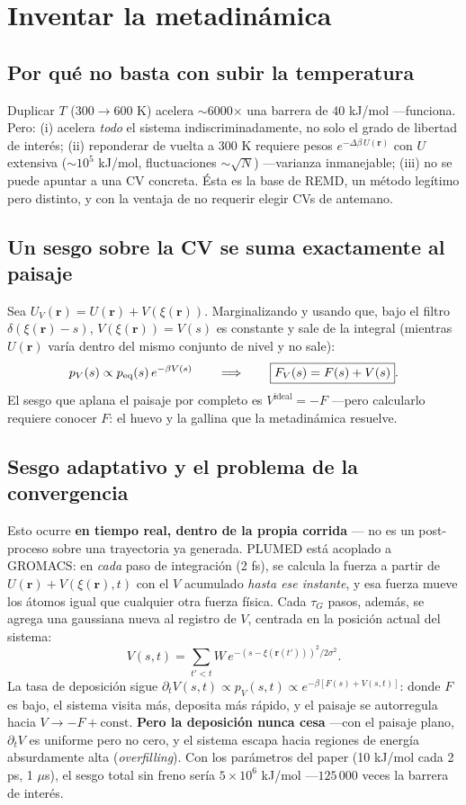 \documentclass[11pt]{article}
\begin{document}
\section{Inventar la metadinámica}

\subsection{Por qué no basta con subir la temperatura}
Duplicar $T$ (300$\to$600 K) acelera $\sim$6000$\times$ una barrera de 40 kJ/mol —funciona. Pero: (i) acelera \emph{todo} el sistema indiscriminadamente, no solo el grado de libertad de interés; (ii) reponderar de vuelta a 300 K requiere pesos $e^{-\Delta\beta\,U(\mathbf{r})}$ con $U$ extensiva ($\sim10^5$ kJ/mol, fluctuaciones $\sim\sqrt{N}$) —varianza inmanejable; (iii) no se puede apuntar a una CV concreta. Ésta es la base de REMD, un método legítimo pero distinto, y con la ventaja de no requerir elegir CVs de antemano.

\subsection{Un sesgo sobre la CV se suma exactamente al paisaje}
Sea $U_V(\mathbf{r}) = U(\mathbf{r}) + V(\xi(\mathbf{r}))$. Marginalizando y usando que, bajo el filtro $\delta(\xi(\mathbf{r})-s)$, $V(\xi(\mathbf{r}))=V(s)$ es constante y sale de la integral (mientras $U(\mathbf{r})$ varía dentro del mismo conjunto de nivel y no sale):
$$p_V(s) \propto p_{\text{eq}}(s)\,e^{-\beta V(s)} \qquad\Longrightarrow\qquad \boxed{F_V(s) = F(s) + V(s)}.$$
El sesgo que aplana el paisaje por completo es $V^{\text{ideal}}=-F$ —pero calcularlo requiere conocer $F$: el huevo y la gallina que la metadinámica resuelve.

\subsection{Sesgo adaptativo y el problema de la convergencia}
Esto ocurre \textbf{en tiempo real, dentro de la propia corrida} --- no es un post-proceso sobre una trayectoria ya generada. PLUMED está acoplado a GROMACS: en \emph{cada} paso de integración (2 fs), se calcula la fuerza a partir de $U(\mathbf r)+V(\xi(\mathbf r),t)$ con el $V$ acumulado \emph{hasta ese instante}, y esa fuerza mueve los átomos igual que cualquier otra fuerza física. Cada $\tau_G$ pasos, además, se agrega una gaussiana nueva al registro de $V$, centrada en la posición actual del sistema:
$$V(s,t) = \sum_{t'<t} W\,e^{-(s-\xi(\mathbf{r}(t')))^2/2\sigma^2}.$$
La tasa de deposición sigue $\partial_tV(s,t) \propto p_V(s,t) \propto e^{-\beta[F(s)+V(s,t)]}$: donde $F$ es bajo, el sistema visita más, deposita más rápido, y el paisaje se autorregula hacia $V\to-F+\text{const}$. \textbf{Pero la deposición nunca cesa} —con el paisaje plano, $\partial_tV$ es uniforme pero no cero, y el sistema escapa hacia regiones de energía absurdamente alta (\emph{overfilling}). Con los parámetros del paper (10 kJ/mol cada 2 ps, 1 $\mu$s), el sesgo total sin freno sería $5\times10^6$ kJ/mol —$125\,000$ veces la barrera de interés.
\end{document}
